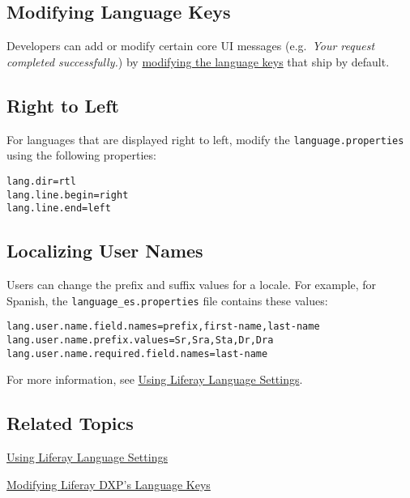 \subsection{Modifying Language Keys}\label{modifying-language-keys}

Developers can add or modify certain core UI messages (e.g.~\emph{Your
request completed successfully.}) by
\href{/docs/7-0/tutorials/-/knowledge_base/t/overriding-language-keys\#modifying-global-language-keys}{modifying
the language keys} that ship by default.

\subsection{Right to Left}\label{right-to-left}

For languages that are displayed right to left, modify the
\texttt{language.properties} using the following properties:

\begin{verbatim}
lang.dir=rtl
lang.line.begin=right
lang.line.end=left
\end{verbatim}

\subsection{Localizing User Names}\label{localizing-user-names}

Users can change the prefix and suffix values for a locale. For example,
for Spanish, the \texttt{language\_es.properties} file contains these
values:

\begin{verbatim}
lang.user.name.field.names=prefix,first-name,last-name
lang.user.name.prefix.values=Sr,Sra,Sta,Dr,Dra
lang.user.name.required.field.names=last-name
\end{verbatim}

For more information, see
\href{/docs/7-0/tutorials/-/knowledge_base/t/using-liferays-language-settings}{Using
Liferay Language Settings}.

\subsection{Related Topics}\label{related-topics}

\href{/docs/7-0/tutorials/-/knowledge_base/t/using-liferays-language-settings}{Using
Liferay Language Settings}

\href{/docs/7-0/tutorials/-/knowledge_base/t/overriding-language-keys\#modifying-global-language-keys}{Modifying
Liferay DXP's Language Keys}

